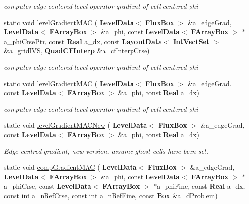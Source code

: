 \begin{DoxyCompactItemize}
\begin{DoxyCompactList}\small\item\em computes edge-\/centered level-\/operator gradient of cell-\/centered phi \end{DoxyCompactList}\item 
static void \hyperlink{class_gradient_a1e5777612a7ff994896d694e2c1c816b}{level\+Gradient\+M\+AC} (\textbf{ Level\+Data}$<$ \textbf{ Flux\+Box} $>$ \&a\+\_\+edge\+Grad, \textbf{ Level\+Data}$<$ \textbf{ F\+Array\+Box} $>$ \&a\+\_\+phi, const \textbf{ Level\+Data}$<$ \textbf{ F\+Array\+Box} $>$ $\ast$a\+\_\+phi\+Crse\+Ptr, const \textbf{ Real} a\+\_\+dx, const \textbf{ Layout\+Data}$<$ \textbf{ Int\+Vect\+Set} $>$ \&a\+\_\+grid\+I\+VS, \textbf{ Quad\+C\+F\+Interp} \&a\+\_\+cf\+Interp\+Crse)
\begin{DoxyCompactList}\small\item\em computes edge-\/centered level-\/operator gradient of cell-\/centered phi \end{DoxyCompactList}\item 
static void \hyperlink{class_gradient_a3d95193c15462219bd5159de5341b291}{level\+Gradient\+M\+AC} (\textbf{ Level\+Data}$<$ \textbf{ Flux\+Box} $>$ \&a\+\_\+edge\+Grad, const \textbf{ Level\+Data}$<$ \textbf{ F\+Array\+Box} $>$ \&a\+\_\+phi, const \textbf{ Real} a\+\_\+dx)
\begin{DoxyCompactList}\small\item\em computes edge-\/centered level-\/operator gradient of cell-\/centered phi \end{DoxyCompactList}\item 
\mbox{\label{class_gradient_a9346502d05a030c51820bc034816d898}} 
static void \hyperlink{class_gradient_a9346502d05a030c51820bc034816d898}{level\+Gradient\+M\+A\+C\+New} (\textbf{ Level\+Data}$<$ \textbf{ Flux\+Box} $>$ \&a\+\_\+edge\+Grad, const \textbf{ Level\+Data}$<$ \textbf{ F\+Array\+Box} $>$ \&a\+\_\+phi, const \textbf{ Real} a\+\_\+dx)
\begin{DoxyCompactList}\small\item\em Edge centred gradient, new version, assume ghost cells have been set. \end{DoxyCompactList}\item 
static void \hyperlink{class_gradient_a50d364c2e9951e70a74200537ebbd73d}{comp\+Gradient\+M\+AC} (\textbf{ Level\+Data}$<$ \textbf{ Flux\+Box} $>$ \&a\+\_\+edge\+Grad, \textbf{ Level\+Data}$<$ \textbf{ F\+Array\+Box} $>$ \&a\+\_\+phi, const \textbf{ Level\+Data}$<$ \textbf{ F\+Array\+Box} $>$ $\ast$a\+\_\+phi\+Crse, const \textbf{ Level\+Data}$<$ \textbf{ F\+Array\+Box} $>$ $\ast$a\+\_\+phi\+Fine, const \textbf{ Real} a\+\_\+dx, const int a\+\_\+n\+Ref\+Crse, const int a\+\_\+n\+Ref\+Fine, const \textbf{ Box} \&a\+\_\+d\+Problem)

\end{DoxyCompactItemize}
